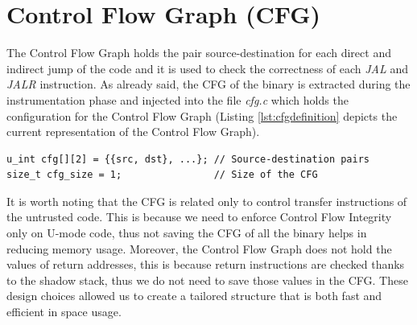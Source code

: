 \section{Control Flow Graph (CFG)}
\label{sec:project_cfg}

The Control Flow Graph holds the pair source-destination for each direct and
indirect jump of the code and it is used to check the correctness of each
\textit{JAL} and \textit{JALR} instruction. As already said, the CFG of the
binary is extracted during the instrumentation phase and injected into the file
\textit{cfg.c} which holds the configuration for the Control Flow Graph (Listing
\ref{lst:cfgdefinition} depicts the current representation of the Control Flow
Graph). \\
\begin{lstlisting}[style=CStyle, caption= Definition of the Control Flow Graph inside \textit{cfg.c}, label={lst:cfgdefinition}]
u_int cfg[][2] = {{src, dst}, ...}; // Source-destination pairs
size_t cfg_size = 1;                // Size of the CFG
\end{lstlisting}

It is worth noting that the CFG is related only to control transfer instructions
of the untrusted code. This is because we need to enforce Control Flow Integrity
only on U-mode code, thus not saving the CFG of all the binary helps in reducing
memory usage. Moreover, the Control Flow Graph does not hold the values of return
addresses, this is because return instructions are checked thanks to the shadow
stack, thus we do not need to save those values in the CFG. These design choices
allowed us to create a tailored structure that is both fast and efficient in
space usage.


